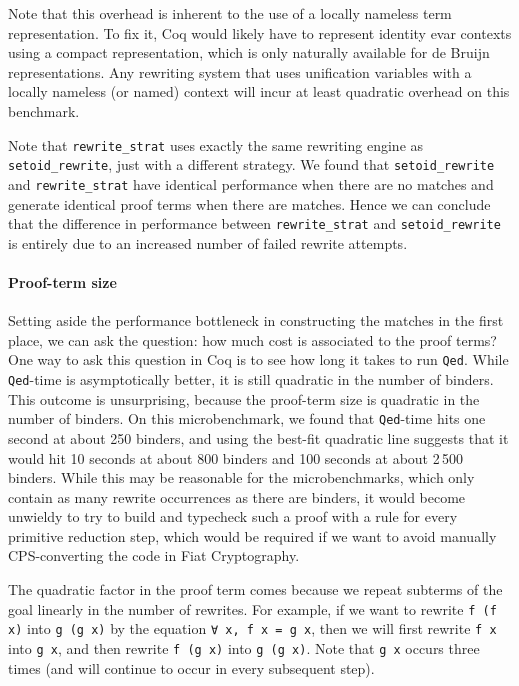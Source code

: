Note that this overhead is inherent to the use of a locally nameless term representation.
To fix it, Coq would likely have to represent identity evar contexts using a compact representation, which is only naturally available for de Bruijn representations.
Any rewriting system that uses unification variables with a locally nameless (or named) context will incur at least quadratic overhead on this benchmark.

Note that \texttt{rewrite_strat} uses exactly the same rewriting engine as \texttt{setoid_rewrite}, just with a different strategy.
We found that \texttt{setoid_rewrite} and \texttt{rewrite_strat} have identical performance when there are no matches and generate identical proof terms when there are matches.
Hence we can conclude that the difference in performance between \texttt{rewrite_strat} and \texttt{setoid_rewrite} is entirely due to an increased number of failed rewrite attempts.

\paragraph{Proof-term size}

Setting aside the performance bottleneck in constructing the matches in the first place, we can ask the question: how much cost is associated to the proof terms?
One way to ask this question in Coq is to see how long it takes to run \texttt{Qed}.
While \texttt{Qed}-time is asymptotically better, it is still quadratic in the number of binders.
This outcome is unsurprising, because the proof-term size is quadratic in the number of binders.
On this microbenchmark, we found that \texttt{Qed}-time hits one second at about 250 binders, and using the best-fit quadratic line suggests that it would hit 10 seconds at about 800 binders and 100 seconds at about 2\,500 binders.
While this may be reasonable for the microbenchmarks, which only contain as many rewrite occurrences as there are binders, it would become unwieldy to try to build and typecheck such a proof with a rule for every primitive reduction step, which would be required if we want to avoid manually CPS-converting the code in Fiat Cryptography.

The quadratic factor in the proof term comes because we repeat subterms of the goal linearly in the number of rewrites.
For example, if we want to rewrite \texttt{f (f x)} into \texttt{g (g x)} by the equation \texttt{∀ x, f x = g x}, then we will first rewrite \texttt{f x} into \texttt{g x}, and then rewrite \texttt{f (g x)} into \texttt{g (g x)}.
Note that \texttt{g x} occurs three times (and will continue to occur in every subsequent step).

